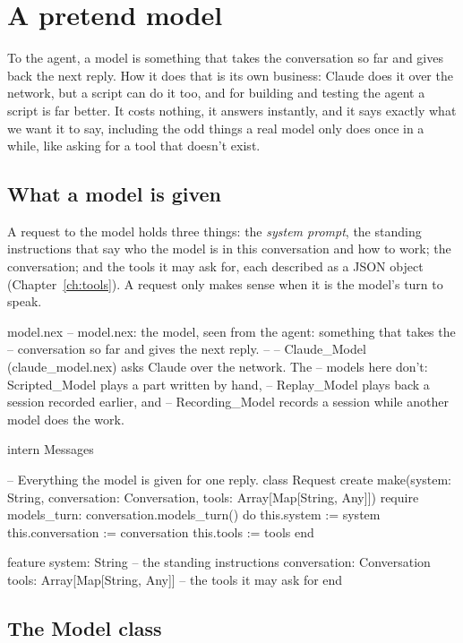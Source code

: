 \chapter{A pretend model}\label{ch:model}

To the agent, a model is something that takes the conversation so far and
gives back the next reply. How it does that is its own business: Claude
does it over the network, but a script can do it too, and for building and
testing the agent a script is far better. It costs nothing, it answers
instantly, and it says exactly what we want it to say, including the odd
things a real model only does once in a while, like asking for a tool that
doesn't exist.

\section{What a model is given}

A request to the model holds three things: the \emph{system prompt}, the
standing instructions that say who the model is in this conversation and
how to work; the conversation; and the tools it may ask for, each
described as a JSON object (Chapter~\ref{ch:tools}). A request only makes
sense when it is the model's turn to speak.

\begin{newfile}{model.nex}
-- model.nex: the model, seen from the agent: something that takes the
-- conversation so far and gives the next reply.
--
-- Claude_Model (claude_model.nex) asks Claude over the network. The
-- models here don't: Scripted_Model plays a part written by hand,
-- Replay_Model plays back a session recorded earlier, and
-- Recording_Model records a session while another model does the work.

intern Messages

-- Everything the model is given for one reply.
class Request
create
  make(system: String, conversation: Conversation, tools: Array[Map[String, Any]])
  require
    models_turn: conversation.models_turn()
  do
    this.system := system
    this.conversation := conversation
    this.tools := tools
  end

feature
  system: String                    -- the standing instructions
  conversation: Conversation
  tools: Array[Map[String, Any]]    -- the tools it may ask for
end
\end{newfile}

\section{The Model class}

